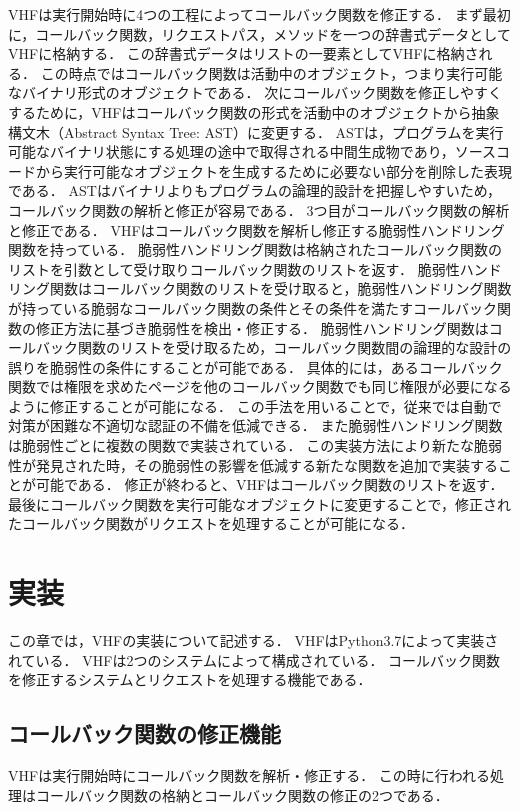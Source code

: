 \documentclass[a4paper,12pt]{jreport}
\begin{document}
VHFは実行開始時に4つの工程によってコールバック関数を修正する．
まず最初に，コールバック関数，リクエストパス，メソッドを一つの辞書式データとしてVHFに格納する．
この辞書式データはリストの一要素としてVHFに格納される．
この時点ではコールバック関数は活動中のオブジェクト，つまり実行可能なバイナリ形式のオブジェクトである．
次にコールバック関数を修正しやすくするために，VHFはコールバック関数の形式を活動中のオブジェクトから抽象構文木（Abstract Syntax Tree: AST）に変更する．
ASTは，プログラムを実行可能なバイナリ状態にする処理の途中で取得される中間生成物であり，ソースコードから実行可能なオブジェクトを生成するために必要ない部分を削除した表現である．
ASTはバイナリよりもプログラムの論理的設計を把握しやすいため，コールバック関数の解析と修正が容易である．
3つ目がコールバック関数の解析と修正である．
VHFはコールバック関数を解析し修正する脆弱性ハンドリング関数を持っている．
脆弱性ハンドリング関数は格納されたコールバック関数のリストを引数として受け取りコールバック関数のリストを返す．
脆弱性ハンドリング関数はコールバック関数のリストを受け取ると，脆弱性ハンドリング関数が持っている脆弱なコールバック関数の条件とその条件を満たすコールバック関数の修正方法に基づき脆弱性を検出・修正する．
脆弱性ハンドリング関数はコールバック関数のリストを受け取るため，コールバック関数間の論理的な設計の誤りを脆弱性の条件にすることが可能である．
具体的には，あるコールバック関数では権限を求めたページを他のコールバック関数でも同じ権限が必要になるように修正することが可能になる．
この手法を用いることで，従来では自動で対策が困難な不適切な認証の不備を低減できる．
また脆弱性ハンドリング関数は脆弱性ごとに複数の関数で実装されている．
この実装方法により新たな脆弱性が発見された時，その脆弱性の影響を低減する新たな関数を追加で実装することが可能である．
修正が終わると、VHFはコールバック関数のリストを返す．
最後にコールバック関数を実行可能なオブジェクトに変更することで，修正されたコールバック関数がリクエストを処理することが可能になる．

\chapter{実装}
この章では，VHFの実装について記述する．
VHFはPython3.7によって実装されている．
VHFは2つのシステムによって構成されている．
コールバック関数を修正するシステムとリクエストを処理する機能である．

\section{コールバック関数の修正機能}
VHFは実行開始時にコールバック関数を解析・修正する．
この時に行われる処理はコールバック関数の格納とコールバック関数の修正の2つである．
\end{document}
